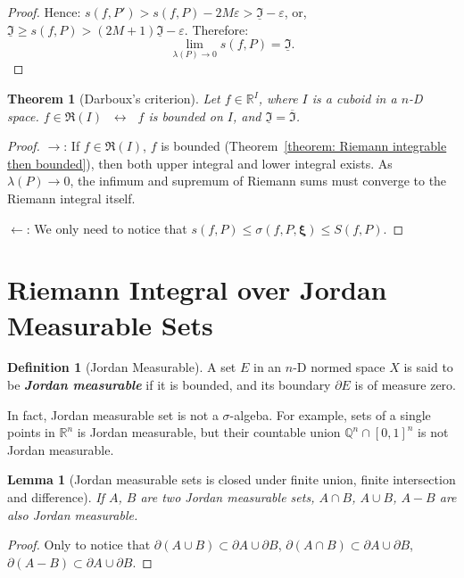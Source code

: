 \documentclass[openany]{book}
\newcommand*{\indexbf}[1]{\emph{\textbf{#1}}\index{#1}} %
\theoremstyle{plain}
\newtheorem{theorem}{Theorem}[section] %
\newtheorem{lemma}{Lemma} %
\theoremstyle{definition}
\newtheorem{definition}{Definition}[section] %
\newcommand*{\bv}{\boldsymbol} %
\newcommand*{\IFF}{\;\leftrightarrow\;} %
\begin{document}
\begin{proof}
	Hence: $s(f, P') > s(f, P) - 2M \varepsilon > \underline{\mathfrak I} - \varepsilon$, or, $\underline{\mathfrak I} \geq s(f, P) > (2M + 1)\underline{\mathfrak I} - \varepsilon$. 
	Therefore:
	\begin{equation*}
		\lim_{\lambda(P) \to 0} s(f, P) = \underline{\mathfrak I}.
	\end{equation*}
\end{proof}

\begin{theorem}[Darboux's criterion]
	\label{theorem: Darboux's criterion}
	Let $f \in \mathbb R^I$, where $I$ is a cuboid in a $n$-D space.
	$f \in \mathfrak R(I)$ $\IFF$ $f$ is bounded on $I$, and $\underline{\mathfrak I} = \overline{\mathfrak I}$.
\end{theorem}
\begin{proof}
	$\to$: If $f \in \mathfrak R(I)$, $f$ is bounded (Theorem~\ref{theorem: Riemann integrable then bounded}), then both upper integral and lower integral exists. 
	As $\lambda(P) \to 0$, the infimum and supremum of Riemann sums must converge to the Riemann integral itself.

	$\gets$: We only need to notice that $s(f, P) \leq \sigma(f, P, \bv \xi) \leq S(f, P)$.
\end{proof}

\section{Riemann Integral over Jordan Measurable Sets}

\begin{definition}[Jordan Measurable]
	A set $E$ in an $n$-D normed space $X$ is said to be \indexbf{Jordan measurable} if it is bounded, and its boundary $\partial E$ is of measure zero.
\end{definition}

In fact, Jordan measurable set is not a $\sigma$-algeba. 
For example, sets of a single points in $\mathbb R^n$ is Jordan measurable, but their countable union $\mathbb Q^n \cap [0, 1]^n$ is not Jordan measurable.

\begin{lemma}[Jordan measurable sets is closed under finite union, finite intersection and difference]
	\label{lemma: Jordan measurable sets is closed under finite union, finite intersection and difference}
	If $A$, $B$ are two Jordan measurable sets, $A \cap B$, $A \cup B$, $A - B$ are also Jordan measurable.
\end{lemma}
\begin{proof}
	Only to notice that $\partial(A \cup B) \subset \partial A \cup \partial B$, $\partial(A \cap B) \subset \partial A \cup \partial B$, $\partial(A - B) \subset \partial A \cup \partial B$.
\end{proof}
\end{document}
